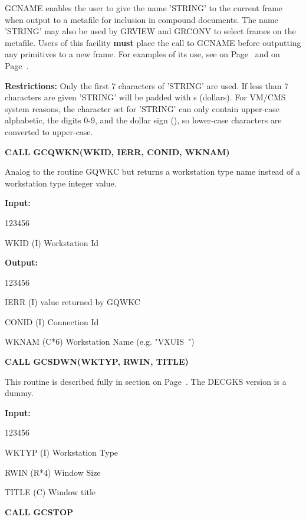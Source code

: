 \begin{OL}
GCNAME enables the user to give the name 'STRING' to the current frame
when output to a metafile for inclusion in compound documents.
The name 'STRING' may also be used by GRVIEW and GRCONV
to select frames on the metafile.
Users of this facility {\bf must} place the call to GCNAME before
outputting any primitives to a new frame.
For examples of its use, see on Page~\pageref{sec:gcnref} and on Page~\pageref{sgmlgra}.
 
{\bf Restrictions:} Only the first 7 characters of 'STRING' are used.
If less than 7 characters are given 'STRING' will be padded with
s (dollars).
For VM/CMS system reasons, the character set for 'STRING' can
only contain upper-case alphabetic, the digits 0-9, and the dollar
sign (), so lower-case characters are converted to upper-case.
\item {\bf CALL GCQWKN(WKID, IERR, CONID, WKNAM)}
 
Analog to the routine GQWKC but returns a workstation type name
instead of a workstation type integer value.
 
{\bf Input:}
\begin{DLtt}{123456}
\item[WKID (I)]Workstation Id
\end{DLtt}
 
{\bf Output:}
\begin{DLtt}{123456}
\item[IERR (I)]value returned by GQWKC
\item[CONID (I)]Connection Id
\item[WKNAM (C*6)]Workstation Name (e.g. "VXUIS~")
\end{DLtt}
\item {\bf CALL GCSDWN(WKTYP, RWIN, TITLE)}
 
This routine is described fully in section on Page~\pageref{sec:vstnref}.
The DECGKS version is a dummy.
 
{\bf Input:}
\begin{DLtt}{123456}
\item[WKTYP (I)]Workstation Type
\item[RWIN (R*4)]Window Size
\item[TITLE (C)]Window title
\end{DLtt}
\item {\bf CALL GCSTOP}
 

\end{OL}
